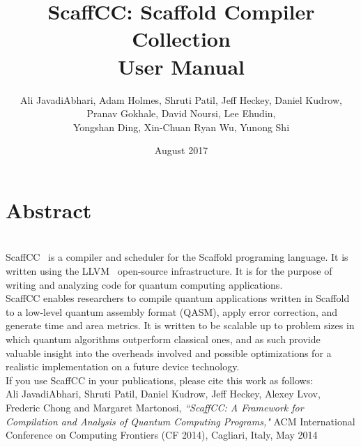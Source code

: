 \documentclass[12pt]{report}
\begin{document}
\title{
    {ScaffCC: Scaffold Compiler Collection}\\
    {\large User Manual}\\
}


\author{Ali JavadiAbhari, Adam Holmes, Shruti Patil, Jeff Heckey, Daniel Kudrow,\\ Pranav Gokhale, David Noursi, Lee Ehudin, \\
Yongshan Ding, Xin-Chuan Ryan Wu, Yunong Shi}

\date{August 2017}



\maketitle

\chapter*{Abstract}
~\\

ScaffCC~\cite{scaffcc} is a compiler and scheduler for the Scaffold programing language. It is written using the LLVM~\cite{LLVM} open-source infrastructure. It is for the purpose of writing and analyzing code for quantum computing applications.\\

ScaffCC enables researchers to compile quantum applications written in Scaffold to a low-level quantum assembly format (QASM), apply error correction, and generate time and area metrics. It is written to be scalable up to problem sizes in which quantum algorithms outperform classical ones, and as such provide valuable insight into the overheads involved and possible optimizations for a realistic implementation on a future device technology.\\

If you use ScaffCC in your publications, please cite this work as follows:\\

Ali JavadiAbhari, Shruti Patil, Daniel Kudrow, Jeff Heckey, Alexey Lvov, Frederic Chong and Margaret Martonosi, {\em``ScaffCC: A Framework for Compilation and Analysis of Quantum Computing Programs,"} ACM International Conference on Computing Frontiers (CF 2014), Cagliari, Italy, May 2014\\

\tableofcontents










\end{document}
